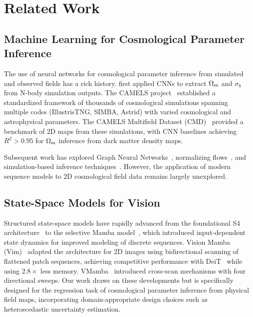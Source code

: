 \documentclass[twocolumn,showpacs,preprintnumbers,amsmath,amssymb,aps,prd]{revtex4-2}
\newcommand{\Om}{\Omega_{\rm m}}
\newcommand{\sig}{\sigma_8}
\newcommand{\Rsq}{R^2}
\begin{document}
\section{Related Work}
\label{sec:related}

\subsection{Machine Learning for Cosmological Parameter Inference}

The use of neural networks for cosmological parameter inference from simulated and
observed fields has a rich history. \citet{ravanbakhsh2017} first applied CNNs to extract
$\Om$ and $\sig$ from N-body simulation outputs. The CAMELS
project~\cite{villaescusa2021} established a standardized framework of thousands of
cosmological simulations spanning multiple codes (IllustrisTNG, SIMBA, Astrid) with varied
cosmological and astrophysical parameters. The CAMELS Multifield Dataset
(CMD)~\cite{villaescusa2022cmd} provided a benchmark of 2D maps from these simulations,
with CNN baselines achieving $\Rsq > 0.95$ for $\Om$ inference from dark matter density
maps.

Subsequent work has explored Graph Neural Networks~\cite{villaescusa2022gnn},
normalizing flows~\cite{dai2023nf}, and simulation-based inference
techniques~\cite{cranmer2020sbi}. However, the application of modern sequence models to
2D cosmological field data remains largely unexplored.

\subsection{State-Space Models for Vision}

Structured state-space models have rapidly advanced from the foundational S4
architecture~\cite{gu2022s4} to the selective Mamba model~\cite{gu2023mamba}, which
introduced input-dependent state dynamics for improved modeling of discrete sequences.
Vision Mamba (Vim)~\cite{zhu2024vim} adapted the architecture for 2D images using
bidirectional scanning of flattened patch sequences, achieving competitive performance with
DeiT~\cite{touvron2021deit} while using $2.8\times$ less memory. VMamba~\cite{liu2024vmamba}
introduced cross-scan mechanisms with four directional sweeps. Our work draws on these
developments but is specifically designed for the regression task of cosmological parameter
inference from physical field maps, incorporating domain-appropriate design choices such as
heteroscedastic uncertainty estimation.
\end{document}
